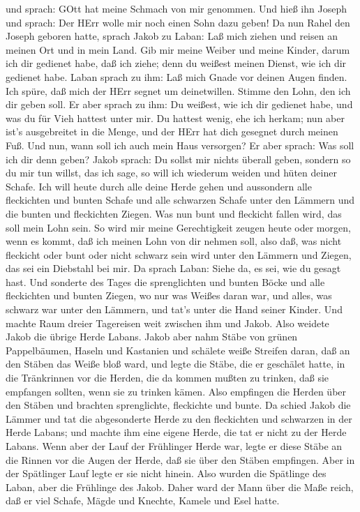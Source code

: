 und sprach: GOtt hat meine Schmach von mir genommen.  Und
hieß ihn Joseph und sprach: Der HErr wolle mir noch einen Sohn dazu
geben!  Da nun Rahel den Joseph geboren hatte, sprach Jakob
zu Laban: Laß mich ziehen und reisen an meinen Ort und in mein Land.
 Gib mir meine Weiber und meine Kinder, darum ich dir
gedienet habe, daß ich ziehe; denn du weißest meinen Dienst, wie ich dir
gedienet habe.  Laban sprach zu ihm: Laß mich Gnade vor
deinen Augen finden. Ich spüre, daß mich der HErr segnet um
deinetwillen.  Stimme den Lohn, den ich dir geben soll.
 Er aber sprach zu ihm: Du weißest, wie ich dir gedienet
habe, und was du für Vieh hattest unter mir.  Du hattest
wenig, ehe ich herkam; nun aber ist's ausgebreitet in die Menge, und der
HErr hat dich gesegnet durch meinen Fuß. Und nun, wann soll ich auch
mein Haus versorgen?  Er aber sprach: Was soll ich dir denn
geben? Jakob sprach: Du sollst mir nichts überall geben, sondern so du
mir tun willst, das ich sage, so will ich wiederum weiden und hüten
deiner Schafe.  Ich will heute durch alle deine Herde gehen
und aussondern alle fleckichten und bunten Schafe und alle schwarzen
Schafe unter den Lämmern und die bunten und fleckichten Ziegen. Was nun
bunt und fleckicht fallen wird, das soll mein Lohn sein. 
So wird mir meine Gerechtigkeit zeugen heute oder morgen, wenn es kommt,
daß ich meinen Lohn von dir nehmen soll, also daß, was nicht fleckicht
oder bunt oder nicht schwarz sein wird unter den Lämmern und Ziegen, das
sei ein Diebstahl bei mir.  Da sprach Laban: Siehe da, es
sei, wie du gesagt hast.  Und sonderte des Tages die
sprenglichten und bunten Böcke und alle fleckichten und bunten Ziegen,
wo nur was Weißes daran war, und alles, was schwarz war unter den
Lämmern, und tat's unter die Hand seiner Kinder.  Und
machte Raum dreier Tagereisen weit zwischen ihm und Jakob. Also weidete
Jakob die übrige Herde Labans.  Jakob aber nahm Stäbe von
grünen Pappelbäumen, Haseln und Kastanien und schälete weiße Streifen
daran, daß an den Stäben das Weiße bloß ward,  und legte
die Stäbe, die er geschälet hatte, in die Tränkrinnen vor die Herden,
die da kommen mußten zu trinken, daß sie empfangen sollten, wenn sie zu
trinken kämen.  Also empfingen die Herden über den Stäben
und brachten sprenglichte, fleckichte und bunte.  Da schied
Jakob die Lämmer und tat die abgesonderte Herde zu den fleckichten und
schwarzen in der Herde Labans; und machte ihm eine eigene Herde, die tat
er nicht zu der Herde Labans.  Wenn aber der Lauf der
Frühlinger Herde war, legte er diese Stäbe an die Rinnen vor die Augen
der Herde, daß sie über den Stäben empfingen.  Aber in der
Spätlinger Lauf legte er sie nicht hinein. Also wurden die Spätlinge des
Laban, aber die Frühlinge des Jakob.  Daher ward der Mann
über die Maße reich, daß er viel Schafe, Mägde und Knechte, Kamele und
Esel hatte.

